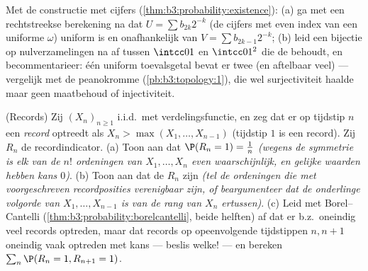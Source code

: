 \begin{exercise}[$\star\star$]\label{exo:b3:probability:10}
Met de constructie met cijfers
(\cref{thm:b3:probability:existence}):
(a) ga met een rechtstreekse berekening na dat $U = \sum
b_{2k}2^{-k}$ (de cijfers met even index van een uniforme
$\omega$) uniform is en onafhankelijk van $V = \sum
b_{2k-1}2^{-k}$;
(b) leid een  bijectie op nulverzamelingen na af tussen
$\intcc01$ en $\intcc01^2$ die de  behoudt, en
becommentarieer: één uniform toevalsgetal bevat er twee (en
aftelbaar veel)  --- vergelijk met de peanokromme
(\cref{pb:b3:topology:1}), die wel surjectiviteit haalde maar
geen maatbehoud of injectiviteit.
\end{exercise}

\begin{exercise}[$\star\star$]\label{exo:b3:probability:11}
(Records) Zij $(X_n)_{n\geq1}$ i.i.d.\ met 
verdelingsfunctie, en zeg dat er op tijdstip $n$ een
\emph{record} optreedt als $X_n > \max(X_1, \dots, X_{n-1})$
(tijdstip $1$ is een record). Zij $R_n$ de recordindicator.
(a) Toon aan dat $\P(R_n = 1) = \frac1n$ \emph{(wegens de
symmetrie is elk van de $n!$ ordeningen van $X_1, \dots, X_n$
even waarschijnlijk, en gelijke waarden hebben kans $0$)}.
(b) Toon aan dat de $R_n$ \emph{} zijn \emph{(tel de
ordeningen die met voorgeschreven recordposities verenigbaar
zijn, of beargumenteer dat de onderlinge volgorde van $X_1,
\dots, X_{n-1}$  is van de rang van $X_n$ ertussen)}.
(c) Leid met Borel--Cantelli
(\cref{thm:b3:probability:borelcantelli}, beide helften) af dat
er b.z.\ oneindig veel records optreden, maar dat records op
opeenvolgende tijdstippen $n, n+1$ oneindig vaak optreden met
kans --- beslis welke! --- en bereken $\sum_n\P(R_n = 1, R_{n+1}
= 1)$.
\end{exercise}

